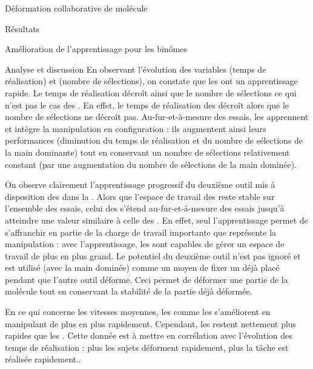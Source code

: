 \documentclass[myfrancais,ngerman,english,french]{mythesis}
\begin{document}
\begin{mychapter}{Déformation collaborative de molécule}
\begin{mysection}{Résultats}
\begin{mysubsection}{Amélioration de l'apprentissage pour les binômes}
\begin{mysubsubsection}{Analyse et discussion}
					En observant l'évolution des variables  (temps de réalisation) et  (nombre de sélections), on constate que les  ont un apprentissage rapide.
					Le temps de réalisation décroît ainsi que le nombre de sélections ce qui n'est pas le cas des .
					En effet, le temps de réalisation des  décroît alors que le nombre de sélections ne décroît pas.
					Au-fur-et-à-mesure des essais, les  apprennent et intègre la manipulation en configuration  : ils augmentent ainsi leurs performances (diminution du temps de réalisation et du nombre de sélections de la main dominante) tout en conservant un nombre de sélections relativement constant (par une augmentation du nombre de sélections de la main dominée).

					On observe clairement l'apprentissage progressif du deuxième outil mis à disposition des  dans la .
					Alors que l'espace de travail des  reste stable sur l'ensemble des essais, celui des  s'étend au-fur-et-à-mesure des essais jusqu'à atteindre une valeur similaire à celle des .
					En effet, seul l'apprentissage permet de s'affranchir en partie de la charge de travail importante que représente la manipulation   : avec l'apprentissage, les  sont capables de gérer un espace de travail de plus en plus grand.
					Le potentiel du deuxième outil n'est pas ignoré et est utilisé (avec la main dominée) comme un moyen de fixer un  déjà placé pendant que l'autre outil déforme.
					Ceci permet de déformer une partie de la molécule tout en conservant la stabilité de la partie déjà déformée.

					En ce qui concerne les vitesses moyennes, les  comme les  s'améliorent en manipulant de plus en plus rapidement.
					Cependant, les  restent nettement plus rapides que les .
					Cette donnée est à mettre en corrélation avec l'évolution des temps de réalisation : plus les sujets déforment rapidement, plus la tâche est réalisée rapidement..


\end{mysubsubsection}
\end{mysubsection}
\end{mysection}
\end{mychapter}
\end{document}
